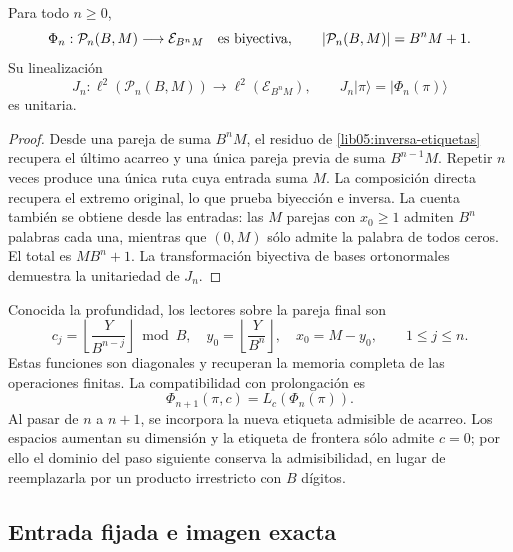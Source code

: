 \begin{theorem}
\label{lib05:teo-rutas}
Para todo \(n\geq0\),
\begin{equation}
 \Phi_n:\mathcal P_n(B,M)\longrightarrow\mathcal E_{B^nM}
 \quad\hbox{es biyectiva},\qquad
 |\mathcal P_n(B,M)|=B^nM+1.
 \label{lib05:biyeccion-rutas}
\end{equation}
Su linealización
\begin{equation}
 J_n:\ell^2(\mathcal P_n(B,M))\longrightarrow
          \ell^2(\mathcal E_{B^nM}),\qquad
 J_n|\pi\rangle=|\Phi_n(\pi)\rangle
 \label{lib05:jn}
\end{equation}
es unitaria.
\end{theorem}

\begin{proof}
Desde una pareja de suma \(B^nM\), el residuo de
\eqref{lib05:inversa-etiquetas} recupera el último acarreo y una
única pareja previa de suma \(B^{n-1}M\). Repetir \(n\) veces
produce una única ruta cuya entrada suma \(M\). La composición
directa recupera el extremo original, lo que prueba biyección e
inversa. La cuenta también se obtiene desde las entradas: las
\(M\) parejas con \(x_0\geq1\) admiten \(B^n\) palabras cada
una, mientras que \((0,M)\) sólo admite la palabra de todos
ceros. El total es \(MB^n+1\). La transformación biyectiva de
bases ortonormales demuestra la unitariedad de \(J_n\).
\end{proof}

Conocida la profundidad, los lectores sobre la pareja final son
\begin{equation}
 c_j=\left\lfloor\frac{Y}{B^{n-j}}\right\rfloor\bmod B,
 \quad y_0=\left\lfloor\frac{Y}{B^n}\right\rfloor,
 \quad x_0=M-y_0,
 \qquad 1\leq j\leq n.
 \label{lib05:lectores-ruta}
\end{equation}
Estas funciones son diagonales y recuperan la memoria completa de
las operaciones finitas. La compatibilidad con prolongación es
\begin{equation}
 \Phi_{n+1}(\pi,c)=L_c(\Phi_n(\pi)).
 \label{lib05:compatibilidad-prolongacion}
\end{equation}
Al pasar de \(n\) a \(n+1\), se incorpora la nueva etiqueta
admisible de acarreo. Los espacios aumentan su dimensión y la
etiqueta de frontera sólo admite \(c=0\); por ello el dominio del
paso siguiente conserva la admisibilidad, en lugar de reemplazarla
por un producto irrestricto con \(B\) dígitos.

\subsection{Entrada fijada e imagen exacta}
\label{lib05:entrada-fija}

